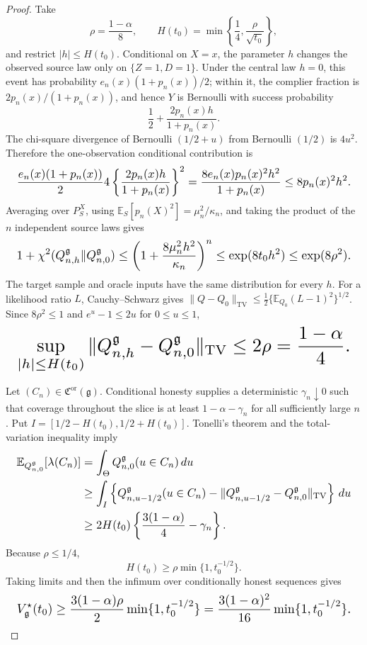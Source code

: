 \documentclass{article}
\begin{document}
\begin{proof}
Take
\[
 \rho=\frac{1-\alpha}{8},
 \qquad
 H(t_0)=\min\left\{\frac14,\frac{\rho}{\sqrt{t_0}}\right\},
\]
and restrict \(|h|\le H(t_0)\). Conditional on \(X=x\), the parameter \(h\) changes the observed source law only on \(\{Z=1,D=1\}\). Under the central law \(h=0\), this event has probability \(e_n(x)(1+p_n(x))/2\); within it, the complier fraction is \(2p_n(x)/(1+p_n(x))\), and hence \(Y\) is Bernoulli with success probability
\[
 \frac12+\frac{2p_n(x)h}{1+p_n(x)}.
\]
The chi-square divergence of Bernoulli \((1/2+u)\) from Bernoulli \((1/2)\) is \(4u^2\). Therefore the one-observation conditional contribution is
\[
\makebox[\linewidth][c]{\resizebox{0.98\linewidth}{!}{\(\displaystyle \frac{e_n(x)(1+p_n(x))}{2}
 4\left\{\frac{2p_n(x)h}{1+p_n(x)}\right\}^2
 =\frac{8e_n(x)p_n(x)^2h^2}{1+p_n(x)}
 \le8p_n(x)^2h^2.\)}}
\]
Averaging over \(P_S^X\), using \(\mathbb E_S[p_n(X)^2]=\mu_n^2/\kappa_n\), and taking the product of the \(n\) independent source laws gives
\[
\makebox[\linewidth][c]{\resizebox{0.98\linewidth}{!}{\(\displaystyle 1+\chi^2(Q_{n,h}^{\mathfrak g}\Vert Q_{n,0}^{\mathfrak g})
 \le\left(1+\frac{8\mu_n^2h^2}{\kappa_n}\right)^n
 \le\exp(8t_0h^2)
 \le\exp(8\rho^2).\)}}
\]
The target sample and oracle inputs have the same distribution for every \(h\). For a likelihood ratio \(L\), Cauchy--Schwarz gives \(\|Q-Q_0\|_{\mathrm{TV}}\le\tfrac12\{\mathbb E_{Q_0}(L-1)^2\}^{1/2}\). Since \(8\rho^2\le1\) and \(e^u-1\le2u\) for \(0\le u\le1\),
\[
\makebox[\linewidth][c]{\resizebox{0.98\linewidth}{!}{\(\displaystyle \sup_{|h|\le H(t_0)}
 \|Q_{n,h}^{\mathfrak g}-Q_{n,0}^{\mathfrak g}\|_{\mathrm{TV}}
 \le2\rho=\frac{1-\alpha}{4}.\)}}
\]

Let \((C_n)\in\mathfrak C^{\mathrm{or}}(\mathfrak g)\). Conditional honesty supplies a deterministic \(\gamma_n\downarrow0\) such that coverage throughout the slice is at least \(1-\alpha-\gamma_n\) for all sufficiently large \(n\). Put \(I=[1/2-H(t_0),1/2+H(t_0)]\). Tonelli's theorem and the total-variation inequality imply
\[
\makebox[\linewidth][c]{\resizebox{0.98\linewidth}{!}{\(\displaystyle \begin{aligned}
 \mathbb E_{Q_{n,0}^{\mathfrak g}}[\lambda(C_n)]
 &=\int_\Theta Q_{n,0}^{\mathfrak g}(u\in C_n)\,du\\
 &\ge\int_I\left\{
 Q_{n,u-1/2}^{\mathfrak g}(u\in C_n)
 -\|Q_{n,u-1/2}^{\mathfrak g}-Q_{n,0}^{\mathfrak g}\|_{\mathrm{TV}}
 \right\}\,du\\
 &\ge2H(t_0)\left\{\frac{3(1-\alpha)}4-\gamma_n\right\}.
 \end{aligned}\)}}
\]
Because \(\rho\le1/4\),
\[
 H(t_0)\ge\rho\min\{1,t_0^{-1/2}\}.
\]
Taking limits and then the infimum over conditionally honest sequences gives
\[
\makebox[\linewidth][c]{\resizebox{0.98\linewidth}{!}{\(\displaystyle V_{\mathfrak g}^\star(t_0)
 \ge\frac{3(1-\alpha)\rho}{2}
 \min\{1,t_0^{-1/2}\}
 =\frac{3(1-\alpha)^2}{16}
 \min\{1,t_0^{-1/2}\}.\)}}
\]


\end{proof}
\end{document}

